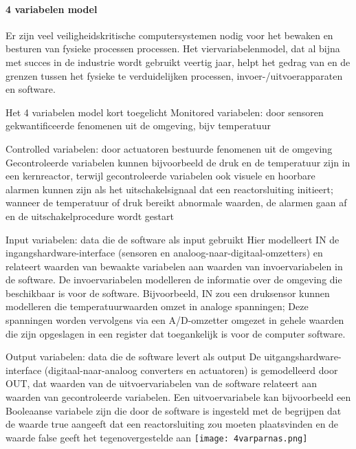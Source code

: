 \documentclass{article}
\begin{document}
	
	
	\paragraph{4 variabelen model}
	
	Er zijn veel veiligheidskritische computersystemen nodig voor het bewaken en besturen van fysieke processen
	processen. Het viervariabelenmodel, dat al bijna met succes in de industrie wordt gebruikt
	veertig jaar, helpt het gedrag van en de grenzen tussen het fysieke te verduidelijken
	processen, invoer-/uitvoerapparaten en software. \cite{ImplementabilityOf4VarSCP2015}
	
	
	
	Het 4 variabelen model kort toegelicht
	Monitored variabelen: door sensoren gekwantificeerde fenomenen uit de omgeving, bijv temperatuur
	
	Controlled variabelen: door actuatoren bestuurde fenomenen uit de omgeving
	Gecontroleerde variabelen kunnen bijvoorbeeld de druk en de temperatuur zijn
	in een kernreactor, terwijl gecontroleerde variabelen ook visuele en hoorbare alarmen kunnen zijn
	als het uitschakelsignaal dat een reactorsluiting initieert; wanneer de temperatuur of druk bereikt
	abnormale waarden, de alarmen gaan af en de uitschakelprocedure wordt gestart
	
	Input variabelen: data die de software als input gebruikt
	Hier modelleert IN de ingangshardware-interface (sensoren en analoog-naar-digitaal-omzetters) en
	relateert waarden van bewaakte variabelen aan waarden van invoervariabelen in de software. De invoervariabelen modelleren de informatie over de omgeving die beschikbaar is voor de software. Bijvoorbeeld,
	IN zou een druksensor kunnen modelleren die temperatuurwaarden omzet in analoge spanningen; Deze spanningen worden vervolgens via een A/D-omzetter omgezet in gehele waarden die zijn opgeslagen in een register dat toegankelijk is voor de computer
	software.
	
	Output variabelen: data die de software levert als output
	De uitgangshardware-interface (digitaal-naar-analoog converters en actuatoren) is gemodelleerd
	door OUT, dat waarden van de uitvoervariabelen van de software relateert aan waarden van gecontroleerde variabelen. Een uitvoervariabele kan bijvoorbeeld een Booleaanse variabele zijn die door de software is ingesteld met de
	begrijpen dat de waarde true aangeeft dat een reactorsluiting zou moeten plaatsvinden en de waarde
	false geeft het tegenovergestelde aan
	\texttt{[image: 4varparnas.png]}
	
\end{document}
